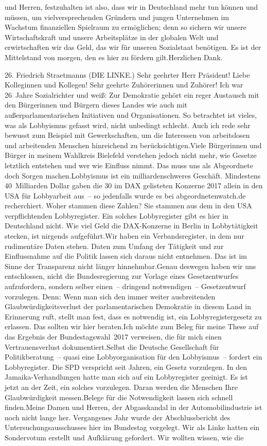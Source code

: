 \documentclass{article}
\begin{document}
und Herren, festzuhalten ist also, dass wir in Deutschland mehr tun können und müssen, um vielversprechenden Gründern und jungen Unternehmen im Wachstum finanziellen Spielraum zu ermöglichen; denn so sichern wir unsere Wirtschaftskraft und unsere Arbeitsplätze in der globalen Welt und erwirtschaften wir das Geld, das wir für unseren Sozialstaat benötigen. Es ist der Mittelstand von morgen, den es hier zu fördern gilt.Herzlichen Dank.




	26. Friedrich Straetmanns (DIE LINKE.) Sehr geehrter Herr Präsident! Liebe Kolleginnen und Kollegen! Sehr geehrte Zuhörerinnen und Zuhörer! Ich war 26 Jahre Sozialrichter und weiß: Zur Demokratie gehört ein reger Austausch mit den Bürgerinnen und Bürgern dieses Landes wie auch mit außerparlamentarischen Initiativen und Organisationen. So betrachtet ist vieles, was als Lobbyismus gefasst wird, nicht unbedingt schlecht. Auch ich rede sehr bewusst zum Beispiel mit Gewerkschaften, um die Interessen von arbeitslosen und arbeitenden Menschen hinreichend zu berücksichtigen.Viele Bürgerinnen und Bürger in meinem Wahlkreis Bielefeld verstehen jedoch nicht mehr, wie Gesetze letztlich entstehen und wer wie Einfluss nimmt. Das muss uns als Abgeordnete doch Sorgen machen.Lobbyismus ist ein milliardenschweres Geschäft. Mindestens 40 Milliarden Dollar gaben die 30 im DAX gelisteten Konzerne 2017 allein in den USA für Lobbyarbeit aus – so jedenfalls wurde es bei abgeordnetenwatch.de recherchiert. Woher stammen diese Zahlen? Sie stammen aus dem in den USA verpflichtenden Lobbyregister. Ein solches Lobbyregister gibt es hier in Deutschland nicht. Wie viel Geld die DAX-Konzerne in Berlin in Lobbytätigkeit stecken, ist nirgends aufgeführt.Wir haben ein Verbandsregister, in dem nur rudimentäre Daten stehen. Daten zum Umfang der Tätigkeit und zur Einflussnahme auf die Politik lassen sich daraus nicht entnehmen. Das ist im Sinne der Transparenz nicht länger hinnehmbar.Genau deswegen haben wir uns entschlossen, nicht die Bundesregierung zur Vorlage eines Gesetzentwurfes aufzufordern, sondern selber einen – dringend notwendigen – Gesetzentwurf vorzulegen. Denn: Wenn man sich den immer weiter ausbreitenden Glaubwürdigkeitsverlust der parlamentarischen Demokratie in diesem Land in Erinnerung ruft, stellt man fest, dass es notwendig ist, ein Lobbyregistergesetz zu erlassen. Das sollten wir hier beraten.Ich möchte zum Beleg für meine These auf das Ergebnis der Bundestagswahl 2017 verweisen, die für mich einen Vertrauensverlust dokumentiert.Selbst die Deutsche Gesellschaft für Politikberatung – quasi eine Lobbyorganisation für den Lobbyismus – fordert ein Lobbyregister. Die SPD verspricht seit Jahren, ein Gesetz vorzulegen. In den Jamaika-Verhandlungen hatte man sich auf ein Lobbyregister geeinigt. Es ist jetzt an der Zeit, ein solches vorzulegen. Daran werden die Menschen Ihre Glaubwürdigkeit messen.Belege für die Notwendigkeit lassen sich schnell finden.Meine Damen und Herren, der Abgasskandal in der Automobilindustrie ist noch nicht lange her. Vergangenes Jahr wurde der Abschlussbericht des Untersuchungsausschusses hier im Bundestag vorgelegt. Wir als Linke hatten ein Sondervotum erstellt und Aufklärung gefordert. Wir wollten wissen, wie die 
\end{document}
